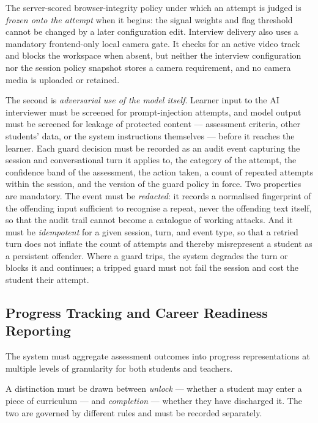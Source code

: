 The server-scored browser-integrity policy under which an attempt is
judged is \textit{frozen onto the attempt} when it begins: the signal
weights and flag threshold cannot be changed by a later configuration
edit. Interview delivery also uses a mandatory frontend-only local
camera gate. It checks for an active video track and blocks the
workspace when absent, but neither the interview configuration nor the
session policy snapshot stores a camera requirement, and no camera
media is uploaded or retained.

The second is \textit{adversarial use of the model itself}. Learner
input to the AI interviewer must be screened for prompt-injection
attempts, and model output must be screened for leakage of protected
content — assessment criteria, other students' data, or the system
instructions themselves — before it reaches the learner. Each guard
decision must be recorded as an audit event capturing the session and
conversational turn it applies to, the category of the attempt, the
confidence band of the assessment, the action taken, a count of
repeated attempts within the session, and the version of the guard
policy in force. Two properties are mandatory. The event must be
\textit{redacted}: it records a normalised fingerprint of the offending
input sufficient to recognise a repeat, never the offending text
itself, so that the audit trail cannot become a catalogue of working
attacks. And it must be \textit{idempotent} for a given session, turn,
and event type, so that a retried turn does not inflate the count of
attempts and thereby misrepresent a student as a persistent offender.
Where a guard trips, the system degrades the turn or blocks it and
continues; a tripped guard must not fail the session and cost the
student their attempt.

\subsection{Progress Tracking and Career Readiness Reporting}
The system must aggregate assessment outcomes into progress 
representations at multiple levels of granularity for both students 
and teachers.

A distinction must be drawn between \textit{unlock} — whether a
student may enter a piece of curriculum — and \textit{completion} —
whether they have discharged it. The two are governed by different
rules and must be recorded separately.

